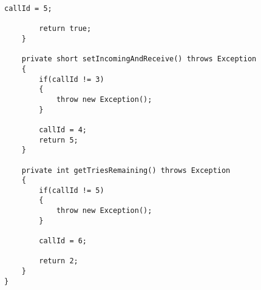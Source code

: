 \begin{lstlisting}[caption={Mocked Java example code from the Java Card samples with the call graph integrity countermeasure implemented},label={lst:example}]
        callId = 5;

        return true;
    }

    private short setIncomingAndReceive() throws Exception
    {
        if(callId != 3)
        {
            throw new Exception();
        }

        callId = 4;
        return 5;
    }

    private int getTriesRemaining() throws Exception
    {
        if(callId != 5)
        {
            throw new Exception();
        }

        callId = 6;

        return 2;
    }
}
\end{lstlisting}